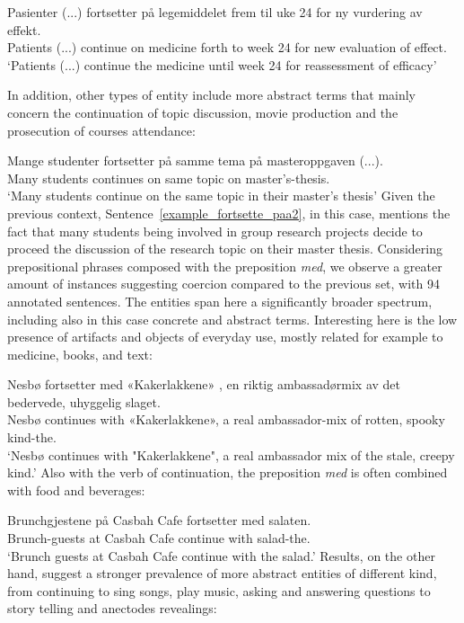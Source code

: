 \documentclass{article}
\begin{document}
        \gll Pasienter (...) fortsetter på legemiddelet frem til uke 24 for ny vurdering av effekt.\\
             Patients (...) continue on medicine forth to week 24 for new evaluation of effect.\\
        \glt ‘Patients (...) continue the medicine until week 24 for reassessment of efficacy’
        \z
    
In addition, other types of entity include more abstract terms that mainly concern the continuation of topic discussion, movie production and the prosecution of courses attendance:
        \ea \label{example_fortsette_paa2} %

        \gll Mange studenter fortsetter på samme tema på masteroppgaven (...).\\
             Many students continues on same topic on master's-thesis.\\
        \glt ‘Many students continue on the same topic in their master's thesis’
        \z
Given the previous context, Sentence~\ref{example_fortsette_paa2}, in this case, mentions the fact that many students being involved in group research projects decide to proceed the discussion of the research topic on their master thesis.   
Considering prepositional phrases composed with the preposition \emph{med}, we observe a greater amount of instances suggesting coercion compared to the previous set, with 94 annotated sentences. The entities span here a significantly broader spectrum, including also in this case concrete and abstract terms. Interesting here is the low presence of artifacts and objects of everyday use, mostly related for example to medicine, books, and text:
        \ea \label{example_fortsette_med1} %

        \gll Nesbø fortsetter med «Kakerlakkene» , en riktig ambassadørmix av det bedervede, uhyggelig slaget.\\
             Nesbø continues with «Kakerlakkene», a real ambassador-mix of rotten, spooky kind-the.\\
        \glt ‘Nesbø continues with "Kakerlakkene", a real ambassador mix of the stale, creepy kind.’
        \z
Also with the verb of continuation, the preposition \emph{med} is often combined with food and beverages:
        \ea \label{example_fortsette_med2} %

        \gll Brunchgjestene på Casbah Cafe fortsetter med salaten.\\
             Brunch-guests at Casbah Cafe continue with salad-the.\\
        \glt ‘Brunch guests at Casbah Cafe continue with the salad.’
        \z
Results, on the other hand, suggest a stronger prevalence of more abstract entities of different kind, from continuing to sing songs, play music, asking and answering questions to story telling and anectodes revealings: 
        \ea \label{example_fortsette_med2} %
\end{document}
